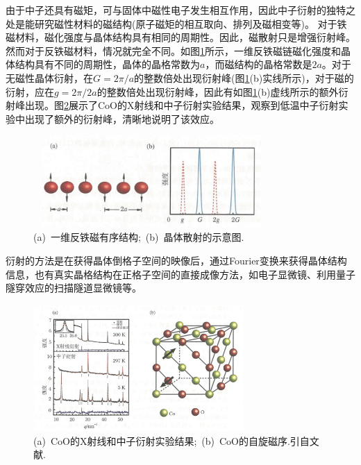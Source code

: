 由于中子还具有磁矩，可与固体中磁性电子发生相互作用，因此中子衍射的独特之处是能研究磁性材料的磁结构(原子磁矩的相互取向、排列及磁相变等)。 对于铁磁材料，磁化强度与晶体结构具有相同的周期性。因此，磁散射只是增强衍射峰。然而对于反铁磁材料，情况就完全不同。如图\ref{Fig:AFM-dispersion}所示，一维反铁磁链磁化强度和晶体结构具有不同的周期性，晶体的晶格常数为$a$，而磁结构的晶格常数是$2a$。对于无磁性晶体衍射，在$G=2\pi/a$的整数倍处出现衍射峰(图\ref{Fig:AFM-dispersion}(b)实线所示)，对于磁的衍射，应在$g=2\pi/2a$的整数倍处出现衍射峰，因此有如图\ref{Fig:AFM-dispersion}(b)虚线所示的额外衍射峰出现。图\ref{Fig:Diffration}展示了CoO的X射线和中子衍射实验结果，观察到低温中子衍射实验中出现了额外的衍射峰，清晰地说明了该效应。
\begin{figure}[h!]
\centering
\vspace*{-0.05in}
\includegraphics[height=1.38in,width=3.55in,viewport=0 0 103 40,clip]{Figures/AFM_dispersion.png}
\caption{\small \textrm{(a)~一维反铁磁有序结构;~(b)~晶体散射的示意图.}}%
\label{Fig:AFM-dispersion}
\end{figure}
衍射的方法是在获得晶体倒格子空间的映像后，通过Fourier变换来获得晶体结构信息，也有真实晶格结构在正格子空间的直接成像方法，如电子显微镜、利用量子隧穿效应的扫描隧道显微镜等。
\begin{figure}[h!]
\centering
\vspace*{-0.05in}
\includegraphics[height=1.90in,width=3.15in,viewport=0 0 130 80,clip]{Figures/X-Ray_Neutron-diffration.png}
\caption{\small \textrm{(a)~CoO的X射线和中子衍射实验结果;~(b)~CoO的自旋磁序.引自文献.}}%
\label{Fig:Diffration}
\end{figure}

